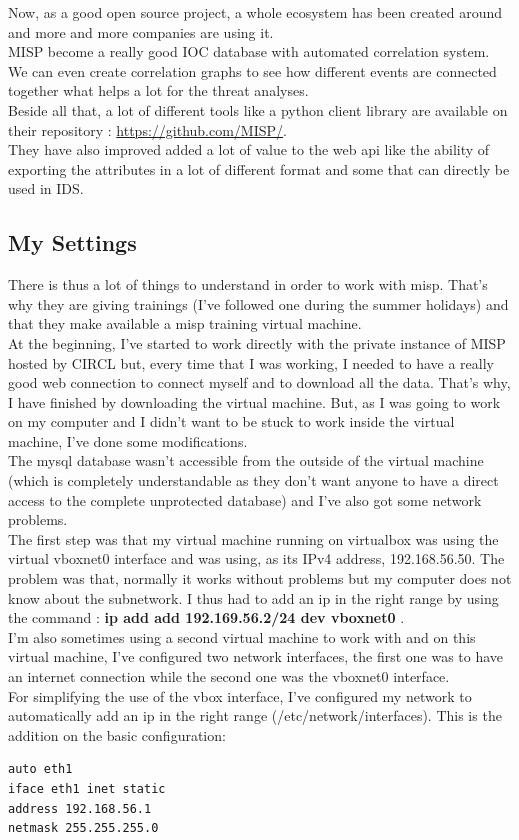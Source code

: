 \documentclass{eplmastersthesis}
\begin{document}
Now, as a good open source project, a whole ecosystem has been created around and more and more companies are using it.\\
MISP become a really good IOC database with automated correlation system. We can even create correlation graphs to see how different events are connected together what helps a lot for the threat analyses.\\
Beside all that, a lot of different tools like a python client library are available on their repository : \url{https://github.com/MISP/}.\\
They have also improved added a lot of value to the web api like the ability of exporting the attributes in a lot of different format and some that can directly be used in IDS.\\

\subsection{My Settings}

There is thus a lot of things to understand in order to work with misp. That's why they are giving trainings (I've followed one during the summer holidays) and that they make available a misp training virtual machine.\\
At the beginning, I've started to work directly with the private instance of MISP hosted by CIRCL but, every time that I was working, I needed to have a really good web connection to connect myself and to download all the data. That's why, I have finished by downloading the virtual machine. But, as I was going to work on my computer and I didn't want to be stuck to work inside the virtual machine, I've done some modifications.\\
The mysql database wasn't accessible from the outside of the virtual machine (which is completely understandable as they don't want anyone to have a direct access to the complete unprotected database) and I've also got some network problems.\\
The first step was that my virtual machine running on virtualbox was using the virtual vboxnet0 interface and was using, as its IPv4 address, 192.168.56.50. The problem was that, normally it works without problems but my computer does not know about the subnetwork. I thus had to add an ip in the right range by using the command :
\textbf{ip add add 192.169.56.2/24 dev vboxnet0} .\\
I'm also sometimes using a second virtual machine to work with and on this virtual machine, I've configured two network interfaces, the first one was to have an internet connection while the second one was the vboxnet0 interface.\\
For simplifying the use of the vbox interface, I've configured my network to automatically add an ip in the right range (/etc/network/interfaces). This is the addition on the basic configuration:
\begin{verbatim}
auto eth1
iface eth1 inet static
address 192.168.56.1
netmask 255.255.255.0
\end{verbatim}
 
\end{document}
